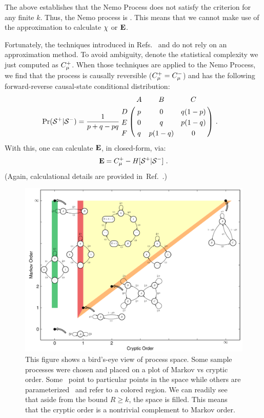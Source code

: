 The above establishes that the Nemo Process does not satisfy the 
criterion for any finite $k$. Thus, the Nemo process is \cryptic{\infty}. This
means that we cannot make use of the  approximation to calculate
$\chi$ or ${\bf E}$.

Fortunately, the techniques introduced in Refs.~\cite{Crut08a} and \cite{Crut08b} 
do not rely on an approximation method. To avoid
ambiguity, denote the statistical complexity we just computed as $C_\mu^{+}$.
When those techniques are applied to the Nemo Process, we find that the process
is causally reversible ($C_\mu^{+} = C_\mu^{-}$) and has the following
forward-reverse causal-state conditional distribution:
\begin{align*}
\Pr(\FutureCausalState|\PastCausalState) &= \frac{1}{p + q - pq}
\bordermatrix{
  & A & B & C \cr
D & p & 0 & q(1-p) \cr
E & 0 & q & p(1-q) \cr
F & q & p(1-q) & 0 \cr
}
 ~.
\end{align*}
With this, one can calculate ${\bf E}$, in closed-form, via:
\begin{align*}
{\bf E} = C_\mu^{+} - H[{\mathcal{S}}^{+}|{\mathcal{S}}^{-}] ~.
\end{align*}
(Again, calculational details are provided in~Ref.~\cite{Maho09b}.)
\begin{figure}[h!]
\centering
\includegraphics[scale=0.7]{../chapter3/figures/tikz/MarkovVsCrypticOrder}
\caption{This figure shows a bird's-eye view of process space. Some sample processes were chosen and placed on a plot of Markov vs cryptic order. Some \eMs\ point to particular points in the space while others are parameterized \eMs\ and refer to a colored region. We can readily see that aside from the bound $R\ge k$, the space is filled. This means that the cryptic order is a nontrivial complement to Markov order.}
\label{}
\end{figure}


